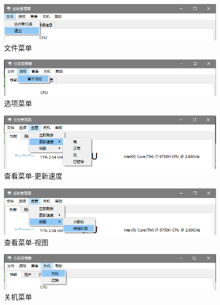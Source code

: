 \documentclass[UTF8,twoside,titlepage]{ctexart}
\begin{document}
\begin{figure}[htbp]
    \centering
    \includegraphics[scale=0.68]{../media/menubar/file menubar.png}
    \caption{文件菜单}
    \label{fig:file}
\end{figure}

\begin{figure}[htbp]
    \centering
    \includegraphics[scale=0.68]{../media/menubar/option menubar.png}
    \caption{选项菜单}
    \label{fig:option}
\end{figure}

\begin{figure}[htbp]
    \centering
    \includegraphics[scale=0.68]{../media/menubar/check menubar rate.png}
    \caption{查看菜单-更新速度}
    \label{fig:check.rate}
\end{figure}

\begin{figure}[htbp]
    \centering
    \includegraphics[scale=0.68]{../media/menubar/check menubar view.png}
    \caption{查看菜单-视图}
    \label{fig:check.view}
\end{figure}

\begin{figure}[htbp]
    \centering
    \includegraphics[scale=0.68]{../media/menubar/shutdown menubar.png}
    \caption{关机菜单}
    \label{fig:shut}
\end{figure}
\end{document}
